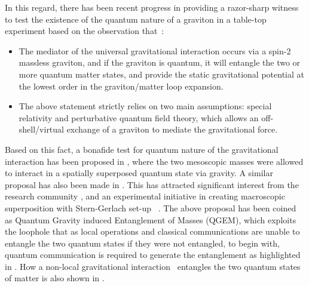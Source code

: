 \documentclass[%
 reprint,
 superscriptaddress,
 amsmath,
 amssymb,
 aps,
 longbibliography
]{revtex4-2}
\begin{document}
In this regard, there has been recent progress in providing a razor-sharp witness to test the existence of the quantum nature of a graviton in a table-top experiment based on the observation that~\cite{marshman2020locality}:
\begin{itemize}
    \item The mediator of the universal gravitational interaction occurs via a spin-2 massless graviton, and if the graviton is quantum, it will entangle the two or more quantum matter states, and provide the static gravitational potential at the lowest order in the graviton/matter loop expansion. 
    \item The above statement strictly relies on two main assumptions: special relativity and perturbative quantum field theory, which allows an off-shell/virtual exchange of a graviton to mediate the gravitational force. 
    
\end{itemize}
\indent Based on this fact, a bonafide test for quantum nature of the gravitational interaction has been proposed in \cite{Bose2017}, where the two mesoscopic masses were allowed to interact in a spatially superposed quantum state via gravity. A similar proposal has also been made in \cite{Marletto2017}. This has attracted significant interest from the research community \cite{Belenchia2018, Christodoulou_2020, howl2020testing, Chevalier:2020uvv, Nguyen2019, Kamp2020,Chevalier:2020uvv, torovs2020relative,Miki:2020hvg,Matsumura:2020law,Rijavec:2020qxd,Toros:2020krn}, and an experimental initiative in creating macroscopic superposition with Stern-Gerlach set-up ~\cite{Margalit:2020qcy}. The above proposal has been coined as  Quantum Gravity induced Entanglement of Masses (QGEM), which exploits the loophole that as local operations and classical communications are unable to entangle the two quantum states if they were not entangled, to begin with, quantum communication is required to generate the entanglement as highlighted in \cite{marshman2020locality}. How a non-local gravitational interaction~\cite{Biswas:2011ar,Biswas:2005qr} entangles the two quantum states of matter is also shown in \cite{marshman2020locality}.
\end{document}
